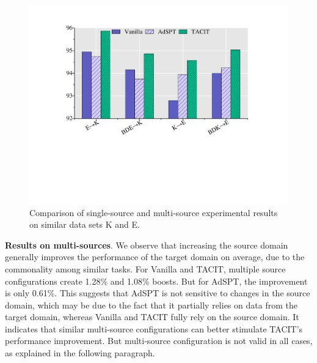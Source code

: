 \documentclass[letterpaper]{article} %
\begin{document}
\begin{figure}[t]
	\centering
	\includegraphics[width=0.9\columnwidth]{multi.pdf} 
	\caption{Comparison of single-source and multi-source experimental results on similar data sets K and E.}
	\label{fig:multi}
\end{figure}

\textbf{Results on multi-sources}. We observe that increasing the source domain generally improves the performance of the target domain on average, due to the commonality among similar tasks. For Vanilla and TACIT, multiple source configurations create 1.28\% and 1.08\% boosts. But for AdSPT, the improvement is only 0.61\%. This suggests that AdSPT is not sensitive to changes in the source domain, which may be due to the fact that it partially relies on data from the target domain, whereas Vanilla and TACIT fully rely on the source domain. It indicates that similar multi-source configurations can better stimulate TACIT's performance improvement. But multi-source configuration is not valid in all cases, as explained in the following paragraph. 
\end{document}
